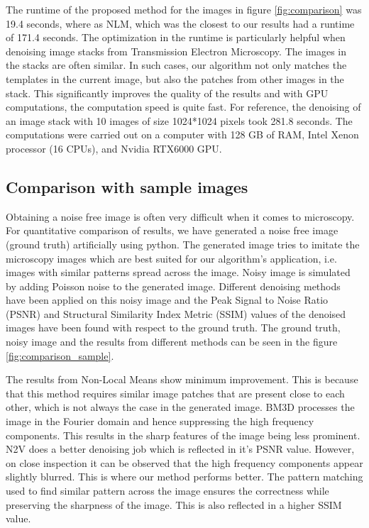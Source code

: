 \documentclass[fleqn,10pt]{wlscirep}
\begin{document}
	The runtime of the proposed method for the images in figure \ref{fig:comparison} was 19.4 seconds, where as NLM, which was the closest to our results had a runtime of 171.4 seconds. The optimization in the runtime is particularly helpful when denoising image stacks from Transmission Electron Microscopy. The images in the stacks are often similar. In such cases, our algorithm not only matches the templates in the current image, but also the patches from other images in the stack. This significantly improves the quality of the results and with GPU computations, the computation speed is quite fast. For reference, the denoising of an image stack with 10 images of size 1024*1024 pixels took 281.8 seconds. The computations were carried out on a computer with 128 GB of RAM, Intel Xenon processor (16 CPUs), and Nvidia RTX6000 GPU.
	

	
	\subsection*{Comparison with sample images}
	
	Obtaining a noise free image is often very difficult when it comes to microscopy. For quantitative comparison of results, we have generated a noise free image (ground truth) artificially using python. The generated image tries to imitate the microscopy images which are best suited for our algorithm's application, i.e. images with similar patterns spread across the image. Noisy image is simulated by adding Poisson noise to the generated image. Different denoising methods have been applied on this noisy image and the Peak Signal to Noise Ratio (PSNR) and Structural Similarity Index Metric (SSIM) values of the denoised images have been found with respect to the ground truth. The ground truth, noisy image and the results from different methods can be seen in the figure \ref{fig:comparison_sample}. 
	
	The results from Non-Local Means show minimum improvement. This is because that this method requires similar image patches that are present close to each other, which is not always the case in the generated image. BM3D processes the image in the Fourier domain and hence suppressing the high frequency components. This results in the sharp features of the image being less prominent. N2V does a better denoising job which is reflected in it's PSNR value. However, on close inspection it can be observed that the high frequency components appear slightly blurred. This is where our method performs better. The pattern matching used to find similar pattern across the image ensures the correctness while preserving the sharpness of the image. This is also reflected in a higher SSIM value.
	
\end{document}
